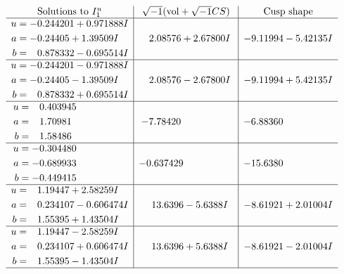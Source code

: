 \documentclass[1p]{elsarticle_modified}
\theoremstyle{definition}
\newcommand{\I}{\sqrt{-1}}
\begin{document}
$$\begin{array}{c|c|c}  
\text{Solutions to }I^u_{1}& \I (\text{vol} + \sqrt{-1}CS) & \text{Cusp shape}\\
 \hline 
\begin{aligned}
u &= -0.244201 + 0.971888 I \\
a &= -0.24405 + 1.39509 I \\
b &= \phantom{-}0.878332 - 0.695514 I\end{aligned}
 & \phantom{-}2.08576 + 2.67800 I & -9.11994 - 5.42135 I \\ \hline\begin{aligned}
u &= -0.244201 - 0.971888 I \\
a &= -0.24405 - 1.39509 I \\
b &= \phantom{-}0.878332 + 0.695514 I\end{aligned}
 & \phantom{-}2.08576 - 2.67800 I & -9.11994 + 5.42135 I \\ \hline\begin{aligned}
u &= \phantom{-}0.403945\phantom{ +0.000000I} \\
a &= \phantom{-}1.70981\phantom{ +0.000000I} \\
b &= \phantom{-}1.58486\phantom{ +0.000000I}\end{aligned}
 & -7.78420\phantom{ +0.000000I} & -6.88360\phantom{ +0.000000I} \\ \hline\begin{aligned}
u &= -0.304480\phantom{ +0.000000I} \\
a &= -0.689933\phantom{ +0.000000I} \\
b &= -0.449415\phantom{ +0.000000I}\end{aligned}
 & -0.637429\phantom{ +0.000000I} & -15.6380\phantom{ +0.000000I} \\ \hline\begin{aligned}
u &= \phantom{-}1.19447 + 2.58259 I \\
a &= \phantom{-}0.234107 - 0.606474 I \\
b &= \phantom{-}1.55395 + 1.43504 I\end{aligned}
 & \phantom{-}13.6396 - 5.6388 I & -8.61921 + 2.01004 I \\ \hline\begin{aligned}
u &= \phantom{-}1.19447 - 2.58259 I \\
a &= \phantom{-}0.234107 + 0.606474 I \\
b &= \phantom{-}1.55395 - 1.43504 I\end{aligned}
 & \phantom{-}13.6396 + 5.6388 I & -8.61921 - 2.01004 I\\
 \hline 
 \end{array}$$\newpage\newpage\renewcommand{\arraystretch}{1}
\end{document}
